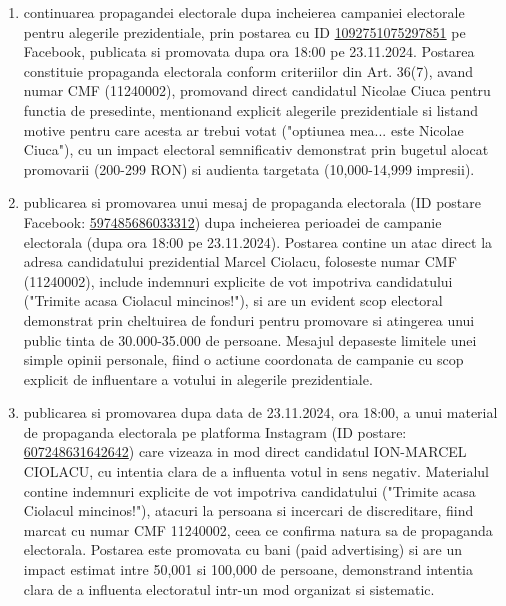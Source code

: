 \documentclass[a4paper,12pt]{article}
\begin{document}
\begin{enumerate}[leftmargin=*, label=\arabic*.)]
    \item continuarea propagandei electorale dupa incheierea campaniei electorale pentru alegerile prezidentiale, prin postarea cu ID \href{https://www.facebook.com/ads/library/?id=1092751075297851}{1092751075297851} pe Facebook, publicata si promovata dupa ora 18:00 pe 23.11.2024. Postarea constituie propaganda electorala conform criteriilor din Art. 36(7), avand numar CMF (11240002), promovand direct candidatul Nicolae Ciuca pentru functia de presedinte, mentionand explicit alegerile prezidentiale si listand motive pentru care acesta ar trebui votat ("optiunea mea... este Nicolae Ciuca"), cu un impact electoral semnificativ demonstrat prin bugetul alocat promovarii (200-299 RON) si audienta targetata (10,000-14,999 impresii).
    \item publicarea si promovarea unui mesaj de propaganda electorala (ID postare Facebook: \href{https://www.facebook.com/ads/library/?id=597485686033312}{597485686033312}) dupa incheierea perioadei de campanie electorala (dupa ora 18:00 pe 23.11.2024). Postarea contine un atac direct la adresa candidatului prezidential Marcel Ciolacu, foloseste numar CMF (11240002), include indemnuri explicite de vot impotriva candidatului ("Trimite acasa Ciolacul mincinos!"), si are un evident scop electoral demonstrat prin cheltuirea de fonduri pentru promovare si atingerea unui public tinta de 30.000-35.000 de persoane. Mesajul depaseste limitele unei simple opinii personale, fiind o actiune coordonata de campanie cu scop explicit de influentare a votului in alegerile prezidentiale.
    \item publicarea si promovarea dupa data de 23.11.2024, ora 18:00, a unui material de propaganda electorala pe platforma Instagram (ID postare: \href{https://www.facebook.com/ads/library/?id=607248631642642}{607248631642642}) care vizeaza in mod direct candidatul ION-MARCEL CIOLACU, cu intentia clara de a influenta votul in sens negativ. Materialul contine indemnuri explicite de vot impotriva candidatului ("Trimite acasa Ciolacul mincinos!"), atacuri la persoana si incercari de discreditare, fiind marcat cu numar CMF 11240002, ceea ce confirma natura sa de propaganda electorala. Postarea este promovata cu bani (paid advertising) si are un impact estimat intre 50,001 si 100,000 de persoane, demonstrand intentia clara de a influenta electoratul intr-un mod organizat si sistematic.
\end{enumerate}
\end{document}
